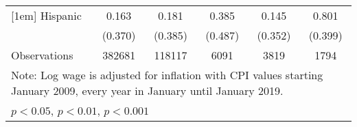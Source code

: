 \begin{table}[htbp]
\begin{tabular}{l*{5}{c}}
[1em]
Hispanic            &       0.163         &       0.181         &       0.385         &       0.145         &       0.801         \\
                    &     (0.370)         &     (0.385)         &     (0.487)         &     (0.352)         &     (0.399)         \\
\hline
Observations        &      382681         &      118117         &        6091         &        3819         &        1794         \\
\hline\hline
\multicolumn{6}{l}{\footnotesize Note: Log wage is adjusted for inflation with CPI values starting January 2009, every year in January until January 2019.}\\
\multicolumn{6}{l}{\footnotesize \sym{*} \(p<0.05\), \sym{**} \(p<0.01\), \sym{***} \(p<0.001\)}\\
\end{tabular}
\end{table}
